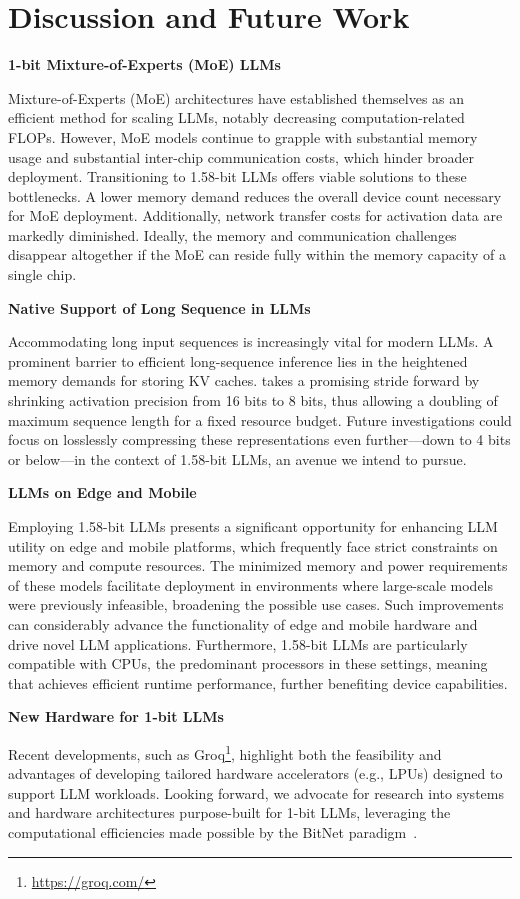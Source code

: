 \section{Discussion and Future Work}

\textbf{1-bit Mixture-of-Experts (MoE) LLMs}

Mixture-of-Experts (MoE) architectures have established themselves as an efficient method for scaling LLMs, notably decreasing computation-related FLOPs. However, MoE models continue to grapple with substantial memory usage and substantial inter-chip communication costs, which hinder broader deployment. Transitioning to 1.58-bit LLMs offers viable solutions to these bottlenecks. A lower memory demand reduces the overall device count necessary for MoE deployment. Additionally, network transfer costs for activation data are markedly diminished. Ideally, the memory and communication challenges disappear altogether if the MoE can reside fully within the memory capacity of a single chip.

\textbf{Native Support of Long Sequence in LLMs}

Accommodating long input sequences is increasingly vital for modern LLMs. A prominent barrier to efficient long-sequence inference lies in the heightened memory demands for storing KV caches.  takes a promising stride forward by shrinking activation precision from 16 bits to 8 bits, thus allowing a doubling of maximum sequence length for a fixed resource budget. Future investigations could focus on losslessly compressing these representations even further—down to 4 bits or below—in the context of 1.58-bit LLMs, an avenue we intend to pursue.

\textbf{LLMs on Edge and Mobile}

Employing 1.58-bit LLMs presents a significant opportunity for enhancing LLM utility on edge and mobile platforms, which frequently face strict constraints on memory and compute resources. The minimized memory and power requirements of these models facilitate deployment in environments where large-scale models were previously infeasible, broadening the possible use cases. Such improvements can considerably advance the functionality of edge and mobile hardware and drive novel LLM applications. Furthermore, 1.58-bit LLMs are particularly compatible with CPUs, the predominant processors in these settings, meaning that  achieves efficient runtime performance, further benefiting device capabilities.

\textbf{New Hardware for 1-bit LLMs}

Recent developments, such as Groq\footnote{\url{https://groq.com/}}, highlight both the feasibility and advantages of developing tailored hardware accelerators (e.g., LPUs) designed to support LLM workloads. Looking forward, we advocate for research into systems and hardware architectures purpose-built for 1-bit LLMs, leveraging the computational efficiencies made possible by the BitNet paradigm~\cite{bitnet}.